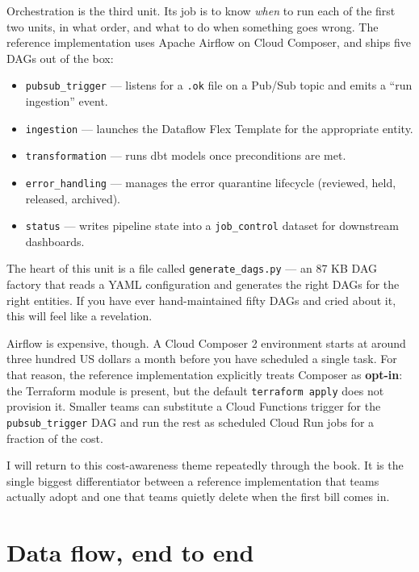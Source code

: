 \documentclass[
  11pt,
  british,
  oneside]{book}
\providecommand{\tightlist}{%
  \setlength{\itemsep}{0pt}\setlength{\parskip}{0pt}}
\begin{document}
Orchestration is the third unit. Its job is to know \emph{when} to run
each of the first two units, in what order, and what to do when
something goes wrong. The reference implementation uses Apache Airflow
on Cloud Composer, and ships five DAGs out of the box:

\begin{itemize}
\tightlist
\item
  \texttt{pubsub\_trigger} --- listens for a \texttt{.ok} file on a
  Pub/Sub topic and emits a ``run ingestion'' event.
\item
  \texttt{ingestion} --- launches the Dataflow Flex Template for the
  appropriate entity.
\item
  \texttt{transformation} --- runs dbt models once preconditions are
  met.
\item
  \texttt{error\_handling} --- manages the error quarantine lifecycle
  (reviewed, held, released, archived).
\item
  \texttt{status} --- writes pipeline state into a \texttt{job\_control}
  dataset for downstream dashboards.
\end{itemize}

The heart of this unit is a file called \texttt{generate\_dags.py} ---
an 87 KB DAG factory that reads a YAML configuration and generates the
right DAGs for the right entities. If you have ever hand-maintained
fifty DAGs and cried about it, this will feel like a revelation.

Airflow is expensive, though. A Cloud Composer 2 environment starts at
around three hundred US dollars a month before you have scheduled a
single task. For that reason, the reference implementation explicitly
treats Composer as \textbf{opt-in}: the Terraform module is present, but
the default \texttt{terraform\ apply} does not provision it. Smaller
teams can substitute a Cloud Functions trigger for the
\texttt{pubsub\_trigger} DAG and run the rest as scheduled Cloud Run
jobs for a fraction of the cost.

I will return to this cost-awareness theme repeatedly through the book.
It is the single biggest differentiator between a reference
implementation that teams actually adopt and one that teams quietly
delete when the first bill comes in.

\hypertarget{data-flow-end-to-end}{%
\section{Data flow, end to end}\label{data-flow-end-to-end}}
\end{document}
